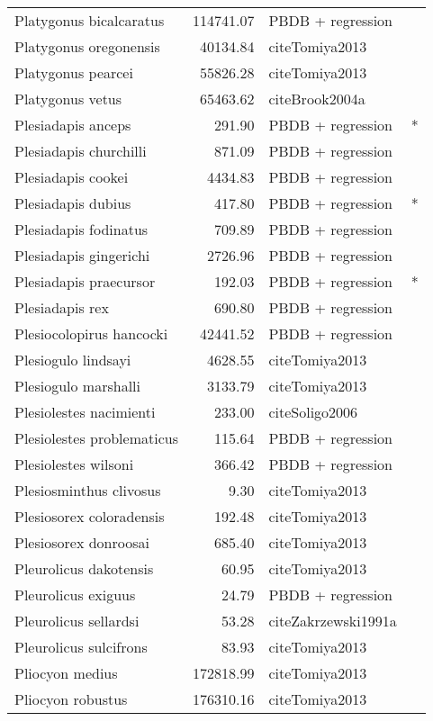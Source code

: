\begin{table}[ht]
\begin{tabular}{lrll}
  Platygonus bicalcaratus & 114741.07 & PBDB + regression &  \\ 
  Platygonus oregonensis & 40134.84 & cite{Tomiya2013} &  \\ 
  Platygonus pearcei & 55826.28 & cite{Tomiya2013} &  \\ 
  Platygonus vetus & 65463.62 & cite{Brook2004a} &  \\ 
  Plesiadapis anceps & 291.90 & PBDB + regression & * \\ 
  Plesiadapis churchilli & 871.09 & PBDB + regression &  \\ 
  Plesiadapis cookei & 4434.83 & PBDB + regression &  \\ 
  Plesiadapis dubius & 417.80 & PBDB + regression & * \\ 
  Plesiadapis fodinatus & 709.89 & PBDB + regression &  \\ 
  Plesiadapis gingerichi & 2726.96 & PBDB + regression &  \\ 
  Plesiadapis praecursor & 192.03 & PBDB + regression & * \\ 
  Plesiadapis rex & 690.80 & PBDB + regression &  \\ 
  Plesiocolopirus hancocki & 42441.52 & PBDB + regression &  \\ 
  Plesiogulo lindsayi & 4628.55 & cite{Tomiya2013} &  \\ 
  Plesiogulo marshalli & 3133.79 & cite{Tomiya2013} &  \\ 
  Plesiolestes nacimienti & 233.00 & cite{Soligo2006} &  \\ 
  Plesiolestes problematicus & 115.64 & PBDB + regression &  \\ 
  Plesiolestes wilsoni & 366.42 & PBDB + regression &  \\ 
  Plesiosminthus clivosus & 9.30 & cite{Tomiya2013} &  \\ 
  Plesiosorex coloradensis & 192.48 & cite{Tomiya2013} &  \\ 
  Plesiosorex donroosai & 685.40 & cite{Tomiya2013} &  \\ 
  Pleurolicus dakotensis & 60.95 & cite{Tomiya2013} &  \\ 
  Pleurolicus exiguus & 24.79 & PBDB + regression &  \\ 
  Pleurolicus sellardsi & 53.28 & cite{Zakrzewski1991a} &  \\ 
  Pleurolicus sulcifrons & 83.93 & cite{Tomiya2013} &  \\ 
  Pliocyon medius & 172818.99 & cite{Tomiya2013} &  \\ 
  Pliocyon robustus & 176310.16 & cite{Tomiya2013} &  \\ 

\end{tabular}
\end{table}
